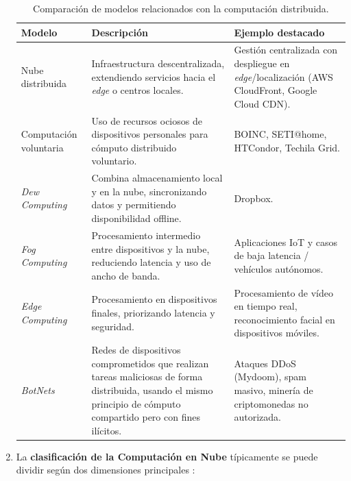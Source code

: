 \begin{enumerate}
	\begin{table}[htbp]
		\centering
		\begin{tabular}{|p{}|p{}|p{}|}
			\hline
			\textbf{Modelo} & \textbf{Descripción} & \textbf{Ejemplo destacado} \\ \hline
			Nube distribuida & Infraestructura descentralizada, extendiendo servicios hacia el \textit{edge} o centros locales. & Gestión centralizada con despliegue en \textit{edge}/localización (AWS CloudFront, Google Cloud CDN). \\ \hline
			Computación voluntaria & Uso de recursos ociosos de dispositivos personales para cómputo distribuido voluntario. & BOINC, SETI@home, HTCondor, Techila Grid. \\ \hline
			\textit{Dew Computing} & Combina almacenamiento local y en la nube, sincronizando datos y permitiendo disponibilidad offline. & Dropbox. \\ \hline
			\textit{Fog Computing} & Procesamiento intermedio entre dispositivos y la nube, reduciendo latencia y uso de ancho de banda. & Aplicaciones IoT y casos de baja latencia / vehículos autónomos. \\ \hline
			\textit{Edge Computing} & Procesamiento en dispositivos finales, priorizando latencia y seguridad. & Procesamiento de vídeo en tiempo real, reconocimiento facial en dispositivos móviles. \\ \hline
			\textit{BotNets} & Redes de dispositivos comprometidos que realizan tareas maliciosas de forma distribuida, usando el mismo principio de cómputo compartido pero con fines ilícitos. & Ataques DDoS (Mydoom), spam masivo, minería de criptomonedas no autorizada. \\ \hline
		\end{tabular}
		\caption{Comparación de modelos relacionados con la computación distribuida.}
		\label{tab:nube_distribuida}
	\end{table}

	\item La \textbf{clasificación de la Computación en Nube} \label{def9} típicamente se puede dividir según dos dimensiones principales \citep{huawei2023cloud}:


\end{enumerate}
